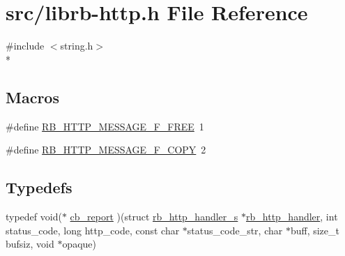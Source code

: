 \hypertarget{librb-http_8h}{\section{src/librb-\/http.h File Reference}
\label{librb-http_8h}
}
{\ttfamily \#include $<$string.\-h$>$}\\*
\subsection*{Macros}
\begin{DoxyCompactItemize}
\item 
\#define \hyperlink{librb-http_8h_aef79f44f520e54cbedce1068fe324720}{R\-B\-\_\-\-H\-T\-T\-P\-\_\-\-M\-E\-S\-S\-A\-G\-E\-\_\-\-F\-\_\-\-F\-R\-E\-E}~1
\item 
\#define \hyperlink{librb-http_8h_a0ffdecd586e5dc8f1eeede6bac9bc19f}{R\-B\-\_\-\-H\-T\-T\-P\-\_\-\-M\-E\-S\-S\-A\-G\-E\-\_\-\-F\-\_\-\-C\-O\-P\-Y}~2
\end{DoxyCompactItemize}
\subsection*{Typedefs}
\begin{DoxyCompactItemize}
\item 
typedef void($\ast$ \hyperlink{librb-http_8h_abcf27caf85ec3ac2b11d1b89aed63966}{cb\-\_\-report} )(struct \hyperlink{structrb__http__handler__s}{rb\-\_\-http\-\_\-handler\-\_\-s} $\ast$\hyperlink{rb__http__handler_8c_a68c2a5bd671ddb123e3f38057b5c45f6}{rb\-\_\-http\-\_\-handler}, int status\-\_\-code, long http\-\_\-code, const char $\ast$status\-\_\-code\-\_\-str, char $\ast$buff, size\-\_\-t bufsiz, void $\ast$opaque)
\end{DoxyCompactItemize}
